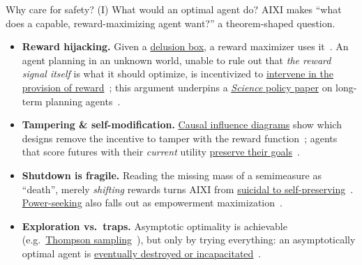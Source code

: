 \documentclass[10pt,aspectratio=169]{beamer}
\begin{document}
\begin{frame}{Why care for safety? (I) What would an optimal agent do?}
\small
AIXI makes ``what does a capable, reward-maximizing agent want?'' a theorem-shaped question.
\pause
\begin{itemize}
    \item \textbf{Reward hijacking.} Given a \href{https://people.idsia.ch/~ring/AGI-2011/Paper-B.pdf}{delusion box}, a reward maximizer uses it~.
    An agent planning in an unknown world, unable to rule out that \emph{the reward signal itself} is what it should optimize,
    is incentivized to \href{https://doi.org/10.1002/aaai.12064}{intervene in the provision of reward}~;
    this argument underpins a \href{https://doi.org/10.1126/science.adl0625}{\emph{Science} policy paper} on long-term planning agents~.
    \pause
    \item \textbf{Tampering \& self-modification.} \href{https://arxiv.org/abs/1908.04734}{Causal influence diagrams} show which designs remove the incentive to tamper with the reward function~;
    agents that score futures with their \emph{current} utility \href{https://arxiv.org/abs/1605.03142}{preserve their goals}~.
    \pause
    \item \textbf{Shutdown is fragile.} Reading the missing mass of a semimeasure as ``death'', merely \emph{shifting} rewards turns AIXI from
    \href{https://arxiv.org/abs/1606.00652}{suicidal to self-preserving}~.
    \href{https://arxiv.org/abs/2502.15820}{Power-seeking} also falls out as empowerment maximization~.
    \pause
    \item \textbf{Exploration vs.\ traps.} Asymptotic optimality is achievable (e.g.\ \href{https://arxiv.org/abs/1602.07905}{Thompson sampling}~),
    but only by trying everything: an asymptotically optimal agent is \href{https://arxiv.org/abs/2006.03357}{eventually destroyed or incapacitated}~.
\end{itemize}
\end{frame}
\end{document}
